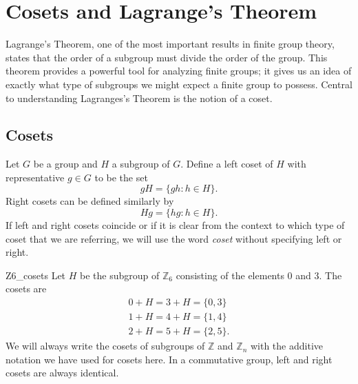 \chapter{Cosets and Lagrange's Theorem}\label{cosets}


Lagrange's Theorem, one of the most important results in finite group theory, states that the order of a subgroup must divide the order of the group.  This theorem provides a powerful tool for analyzing finite groups; it gives us an idea of exactly what type of subgroups we might expect a finite group to possess.  Central to understanding Lagranges's Theorem is the notion of a coset.


\section{Cosets}

Let $G$ be a group and $H$ a subgroup of $G$.  Define a {\bfi left  coset\/} of $H$ with {\bfi  representative} $g \in G$ to be the set 
$$
gH = \{ gh : h \in H \}.
$$
{\bfi Right cosets\/} can be defined similarly by
$$
Hg = \{ hg : h \in H \}.
$$
If left and right cosets coincide or if it is clear from the context to which type of coset that we are referring, we will use the word {\em coset\/} without specifying left or right. 

\begin{example}{Z6_cosets}
Let $H$ be the subgroup of ${\mathbb Z}_6$ consisting of the elements 0 and 3.  The cosets are 
\begin{gather*}
0 + H = 3 + H = \{ 0, 3 \} \\
1 + H = 4 + H = \{ 1, 4 \} \\
2 + H = 5 + H = \{ 2, 5 \}.
\end{gather*}
We will always write the cosets of subgroups of ${\mathbb Z}$ and ${\mathbb Z}_n$ with the additive notation we have used for cosets here.  In a commutative group, left and right cosets are always identical. 
\end{example}

